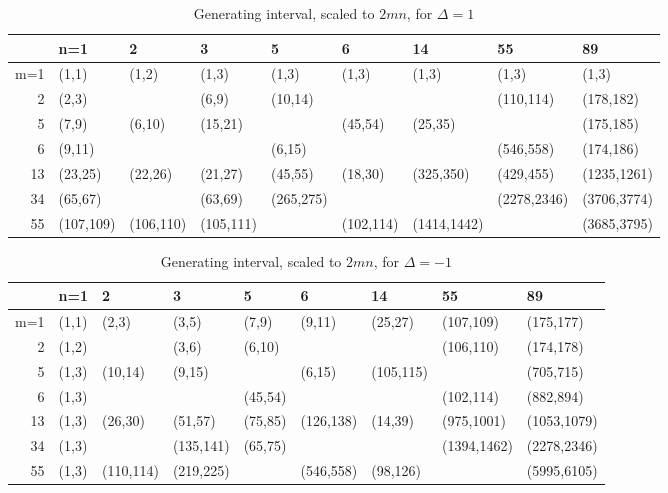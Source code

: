 \documentclass[a4paper]{article}
\begin{document}
\begin{table}[ht]
\centering
\begin{tabular}{rllllllll}
  \hline
 & n=1 & 2 & 3 & 5 & 6 & 14 & 55 & 89 \\ 
  \hline
m=1 & (1,1) & (1,2) & (1,3) & (1,3) & (1,3) & (1,3) & (1,3) & (1,3) \\ 
  2 & (2,3) &  & (6,9) & (10,14) &  &  & (110,114) & (178,182) \\ 
  5 & (7,9) & (6,10) & (15,21) &  & (45,54) & (25,35) &  & (175,185) \\ 
  6 & (9,11) &  &  & (6,15) &  &  & (546,558) & (174,186) \\ 
  13 & (23,25) & (22,26) & (21,27) & (45,55) & (18,30) & (325,350) & (429,455) & (1235,1261) \\ 
  34 & (65,67) &  & (63,69) & (265,275) &  &  & (2278,2346) & (3706,3774) \\ 
  55 & (107,109) & (106,110) & (105,111) &  & (102,114) & (1414,1442) &  & (3685,3795) \\ 
   \hline
\end{tabular}
\caption{Generating interval, scaled to $2mn$, for $\Delta=1$} 
\label{tab:genintp}
\end{table}%
\begin{table}[ht]
\centering
\begin{tabular}{rllllllll}
  \hline
 & n=1 & 2 & 3 & 5 & 6 & 14 & 55 & 89 \\ 
  \hline
m=1 & (1,1) & (2,3) & (3,5) & (7,9) & (9,11) & (25,27) & (107,109) & (175,177) \\ 
  2 & (1,2) &  & (3,6) & (6,10) &  &  & (106,110) & (174,178) \\ 
  5 & (1,3) & (10,14) & (9,15) &  & (6,15) & (105,115) &  & (705,715) \\ 
  6 & (1,3) &  &  & (45,54) &  &  & (102,114) & (882,894) \\ 
  13 & (1,3) & (26,30) & (51,57) & (75,85) & (126,138) & (14,39) & (975,1001) & (1053,1079) \\ 
  34 & (1,3) &  & (135,141) & (65,75) &  &  & (1394,1462) & (2278,2346) \\ 
  55 & (1,3) & (110,114) & (219,225) &  & (546,558) & (98,126) &  & (5995,6105) \\ 
   \hline
\end{tabular}
\caption{Generating interval, scaled to $2mn$, for $\Delta=-1$} 
\label{tab:genintm}
\end{table}\clearpage
\end{document}
